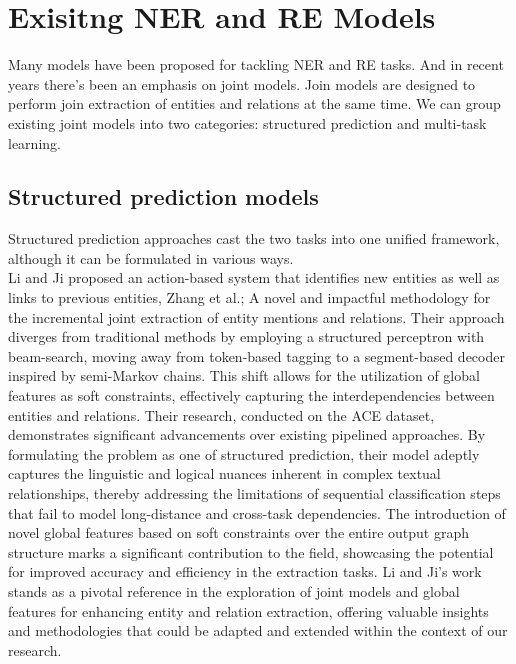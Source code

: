 \section{Exisitng NER and RE Models}
Many models have been proposed for tackling NER and RE tasks. And in recent years there's been an emphasis on joint models. Join models are designed to perform join extraction of entities and relations\cite{Zhong2020AFE} at the same time. We can group existing joint models into two categories: structured prediction and multi-task learning.

\subsection{Structured prediction models}
Structured prediction approaches cast the two tasks into one unified framework, although it can be formulated in various ways.\\
Li and Ji\cite{li-ji-2014-incremental} proposed an action-based system that identifies new entities as well as links to previous entities, Zhang et al.\cite{zhang-etal-2017-end};
A novel and impactful methodology for the incremental joint extraction of entity mentions and relations. Their approach diverges from traditional methods by employing a structured perceptron with beam-search, moving away from token-based tagging to a segment-based decoder inspired by semi-Markov chains. This shift allows for the utilization of global features as soft constraints, effectively capturing the interdependencies between entities and relations. Their research, conducted on the ACE dataset, demonstrates significant advancements over existing pipelined approaches. By formulating the problem as one of structured prediction, their model adeptly captures the linguistic and logical nuances inherent in complex textual relationships, thereby addressing the limitations of sequential classification steps that fail to model long-distance and cross-task dependencies. The introduction of novel global features based on soft constraints over the entire output graph structure marks a significant contribution to the field, showcasing the potential for improved accuracy and efficiency in the extraction tasks. Li and Ji's work stands as a pivotal reference in the exploration of joint models and global features for enhancing entity and relation extraction, offering valuable insights and methodologies that could be adapted and extended within the context of our research.\\

